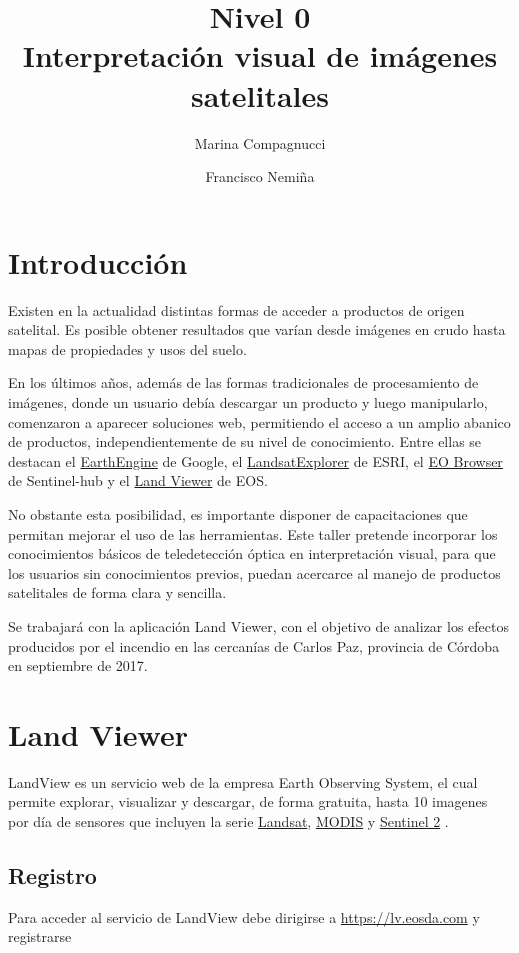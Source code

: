 \documentclass[a4paper,12pt]{book}
\title{{\large Nivel 0} \\ Interpretación visual de imágenes satelitales}
\author{Marina Compagnucci \and Francisco Nemiña}
\begin{document}
\maketitle
\titlepage

\chapter{Introducción}
Existen en la actualidad distintas formas de acceder a productos de origen satelital. Es posible obtener resultados que varían desde imágenes en crudo hasta mapas de propiedades y usos del suelo.

En los últimos años, además de las formas tradicionales de procesamiento de imágenes, donde un usuario debía descargar un producto y luego manipularlo, comenzaron a aparecer soluciones web, permitiendo el acceso a un amplio abanico de productos, independientemente de su nivel de conocimiento. Entre ellas se destacan el \href{https://explorer.earthengine.google.com/#workspace}{EarthEngine} de Google, el \href{http://landsatexplorer.esri.com/}{LandsatExplorer} de ESRI, el \href{http://apps.sentinel-hub.com/eo-browser/}{EO Browser} de Sentinel-hub y el \href{lv.eosda.com}{Land Viewer} de EOS.

No obstante esta posibilidad, es importante disponer de capacitaciones que permitan mejorar el uso de las herramientas. Este taller pretende incorporar los conocimientos básicos de teledetección óptica en interpretación visual, para que los usuarios sin conocimientos previos, puedan acercarce al manejo de productos satelitales de forma clara y sencilla.

Se trabajará con la aplicación Land Viewer, con el objetivo de analizar los efectos producidos por el incendio en las cercanías de Carlos Paz, provincia de Córdoba en septiembre de 2017.

\chapter{Land Viewer}

LandView es un servicio web de la empresa Earth Observing System, el cual permite explorar, visualizar y descargar, de forma gratuita, hasta 10 imagenes por día de sensores que incluyen la serie \href{https://landsat.usgs.gov/}{Landsat}, \href{https://lpdaac.usgs.gov/dataset_discovery/modis/modis_products_table/mcd43a4}{MODIS} y \href{https://sentinel.esa.int/web/sentinel/missions/sentinel-2}{Sentinel 2} .

\section{Registro}
Para acceder al servicio de LandView debe dirigirse a \url{https://lv.eosda.com} y registrarse
\end{document}

